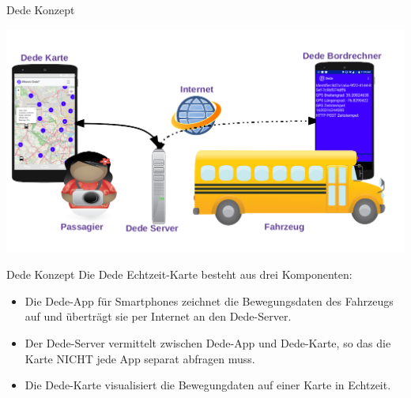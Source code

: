 
\bgroup


\begin{frame}{Dede Konzept}
  \begin{center}
    \includegraphics[width=\paperwidth]{dede/dede-concept}
  \end{center}
\end{frame}

\begin{frame}{Dede Konzept}
  Die Dede Echtzeit-Karte besteht aus drei Komponenten:
  \begin{itemize}
  \item Die Dede-App für Smartphones zeichnet die Bewegungsdaten des Fahrzeugs auf und überträgt sie per Internet an den Dede-Server.
  \item Der Dede-Server vermittelt zwischen Dede-App und Dede-Karte, so das die Karte NICHT jede App separat abfragen muss.
  \item Die Dede-Karte visualisiert die Bewegungdaten auf einer Karte in Echtzeit.
  \end{itemize}
\end{frame}

\egroup
